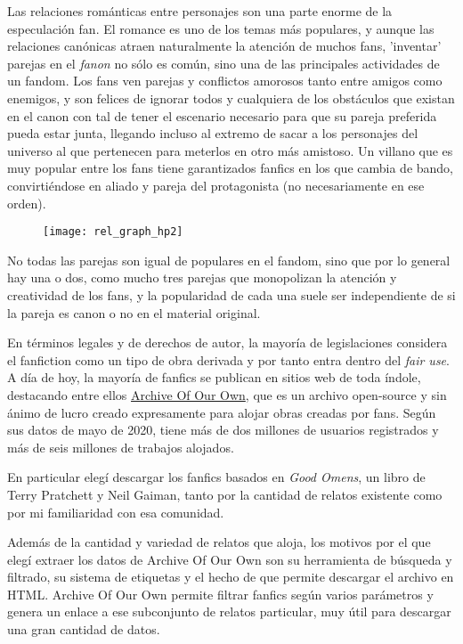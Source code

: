 \documentclass{pre-tfg}
\begin{document}
Las relaciones románticas entre personajes son una parte enorme de la especulación fan. El romance es uno de los temas más populares, y aunque las relaciones canónicas atraen naturalmente la atención de muchos fans, 'inventar' parejas en el \textit{fanon} no sólo es común, sino una de las principales actividades de un fandom. Los fans ven parejas y conflictos amorosos tanto entre amigos como enemigos,  y son felices de ignorar todos y cualquiera de los obstáculos que existan en el canon con tal de tener el escenario necesario para que su pareja preferida pueda estar junta, llegando incluso al extremo de sacar a los personajes del universo al que pertenecen para meterlos en otro más amistoso. Un villano que es muy popular entre los fans tiene garantizados fanfics en los que cambia de bando, convirtiéndose en aliado y pareja del protagonista (no necesariamente en ese orden).

\begin{figure}
	\label{fig:graph_hp}
	\texttt{[image: rel\_graph\_hp2]}
	\centering
\end{figure}

No todas las parejas son igual de populares en el fandom, sino que por lo general hay una o dos, como mucho tres parejas que monopolizan la atención y creatividad de los fans, y la popularidad de cada una suele ser independiente de si la pareja es canon o no en el material original.

En términos legales y de derechos de autor, la mayoría de legislaciones considera el fanfiction como un tipo de obra derivada \cite{woosh_1998} y por tanto entra dentro del \textit{fair use}. A día de hoy, la mayoría de fanfics se publican en sitios web de toda índole, destacando entre ellos \href{archiveofourown.org}{Archive Of Our Own}, que es un archivo open-source y sin ánimo de lucro creado expresamente para alojar obras creadas por fans. Según sus datos de mayo de 2020, tiene más de dos millones de usuarios registrados y más de seis millones de trabajos alojados. 


En particular elegí descargar los fanfics basados en \textit{Good Omens}, un libro de Terry Pratchett y Neil Gaiman, tanto por la cantidad de relatos existente como por mi familiaridad con esa comunidad.

Además de la cantidad y variedad de relatos que aloja, los motivos por el que elegí extraer los datos de  Archive Of Our Own son su herramienta de búsqueda y filtrado, su sistema de etiquetas y el hecho de que permite descargar el archivo en HTML. Archive Of Our Own permite filtrar fanfics según varios parámetros y genera un enlace a ese subconjunto de relatos particular, muy útil para descargar una gran cantidad de datos.
\end{document}
